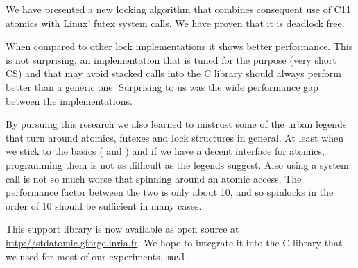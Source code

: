 We have presented a new locking algorithm that combines consequent use
of C11 atomics with Linux' futex system calls. We have proven that it
is deadlock free.

When compared to other lock implementations it shows better
performance. This is not surprising, an implementation that is tuned
for the purpose (very short CS) and that may avoid stacked calls into
the C library should always perform better than a generic one.
Surprising to us was the wide performance gap between the
implementations.

By pursuing this research we also learned to mistrust some of the
urban legends that turn around atomics, futexes and lock structures in
general. At least when we stick to the basics ( and
) and if we have a decent interface for atomics,
programming them is not as difficult as the legends suggest. Also
using a system call is not so much worse that spinning around an
atomic access. The performance factor between the two is only about
10, and so spinlocks in the order of 10 should be sufficient in many
cases.

This support library is now available as open source at
\url{http://stdatomic.gforge.inria.fr}. We hope to integrate it into the C library
that we used for most of our experiments, \texttt{musl}.


